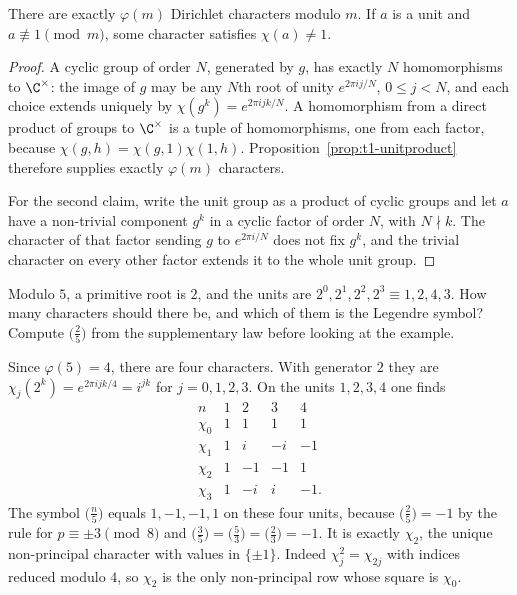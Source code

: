 \begin{theorem}\label{thm:t1-charcount}
There are exactly $\varphi(m)$ Dirichlet characters modulo $m$. If $a$ is a unit and $a\not\equiv1\pmod m$, some character satisfies $\chi(a)\ne1$.
\end{theorem}
\begin{proof}
A cyclic group of order $N$, generated by $g$, has exactly $N$ homomorphisms to $\C^\times$: the image of $g$ may be any $N$th root of unity $e^{2\pi i j/N}$, $0\le j<N$, and each choice extends uniquely by $\chi(g^k)=e^{2\pi i jk/N}$. A homomorphism from a direct product of groups to $\C^\times$ is a tuple of homomorphisms, one from each factor, because $\chi(g,h)=\chi(g,1)\chi(1,h)$. Proposition~\ref{prop:t1-unitproduct} therefore supplies exactly $\varphi(m)$ characters.

For the second claim, write the unit group as a product of cyclic groups and let $a$ have a non-trivial component $g^k$ in a cyclic factor of order $N$, with $N\nmid k$. The character of that factor sending $g$ to $e^{2\pi i/N}$ does not fix $g^k$, and the trivial character on every other factor extends it to the whole unit group.
\end{proof}

\begin{think}
Modulo $5$, a primitive root is $2$, and the units are $2^0,2^1,2^2,2^3\equiv1,2,4,3$. How many characters should there be, and which of them is the Legendre symbol? Compute $\bigl(\frac2 5\bigr)$ from the supplementary law before looking at the example.
\end{think}

\begin{examplex}
Since $\varphi(5)=4$, there are four characters. With generator $2$ they are $\chi_j(2^k)=e^{2\pi i jk/4}=i^{jk}$ for $j=0,1,2,3$. On the units $1,2,3,4$ one finds
\[
\begin{array}{c|cccc}
n&1&2&3&4\\\hline
\chi_0&1&1&1&1\\
\chi_1&1&i&-i&-1\\
\chi_2&1&-1&-1&1\\
\chi_3&1&-i&i&-1.
\end{array}
\]
The symbol $\bigl(\frac n5\bigr)$ equals $1, -1, -1, 1$ on these four units, because $\bigl(\frac25\bigr)=-1$ by the rule for $p\equiv\pm3\pmod8$ and $\bigl(\frac35\bigr)=\bigl(\frac53\bigr)=\bigl(\frac23\bigr)=-1$. It is exactly $\chi_2$, the unique non-principal character with values in $\{\pm1\}$. Indeed $\chi_j^2=\chi_{2j}$ with indices reduced modulo $4$, so $\chi_2$ is the only non-principal row whose square is $\chi_0$.
\end{examplex}

